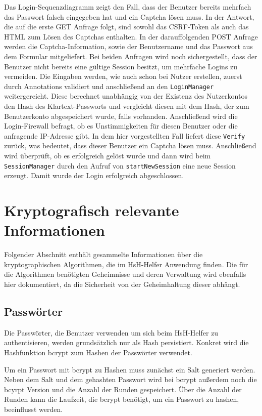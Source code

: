 \documentclass[12pt,DIV14,BCOR10mm,a4paper,parskip=half-,headsepline,headinclude,english,ngerman,bibliography=totocnumbered]{scrreprt}
\begin{document}
Das Login-Sequenzdiagramm zeigt den Fall, dass der Benutzer bereits mehrfach das Passwort falsch eingegeben hat und ein Captcha lösen muss. In der Antwort, die auf die erste GET Anfrage folgt, sind sowohl das CSRF-Token als auch das HTML zum Lösen des Captchas enthalten. In der darauffolgenden POST Anfrage werden die Captcha-Information, sowie der Benutzername und das Passwort aus dem Formular mitgeliefert. Bei beiden Anfragen wird noch sichergestellt, dass der Benutzer nicht bereits eine gültige Session besitzt, um mehrfache Logins zu vermeiden. Die Eingaben werden, wie auch schon bei Nutzer erstellen, zuerst durch Annotations validiert und anschließend an den \texttt{LoginManager} weitergereicht. Diese berechnet unabhängig von der Existenz des Nutzerkontos den Hash des Klartext-Passworts und vergleicht diesen mit dem Hash, der zum Benutzerkonto abgespeichert wurde, falls vorhanden. Anschließend wird die Login-Firewall befragt, ob es Unstimmigkeiten für diesen Benutzer oder die anfragende IP-Adresse gibt. In dem hier vorgestellten Fall liefert diese \texttt{Verify} zurück, was bedeutet, dass dieser Benutzer ein Captcha lösen muss. Anschließend wird überprüft, ob es erfolgreich gelöst wurde und dann wird beim \texttt{SessionManager} durch den Aufruf von \texttt{startNewSession} eine neue Session erzeugt. Damit wurde der Login erfolgreich abgeschlossen.

\chapter{Kryptografisch relevante Informationen}
Folgender Abschnitt enthält gesammelte Informationen über die kryptographischen Algorithmen, die im HsH-Helfer Anwendung finden. Die für die Algorithmen benötigten Geheimnisse und deren Verwaltung wird ebenfalls hier dokumentiert, da die Sicherheit von der Geheimhaltung dieser abhängt.

\section{Passwörter}
Die Passwörter, die Benutzer verwenden um sich beim HsH-Helfer zu authentisieren, werden grundsätzlich nur als Hash persistiert. Konkret wird die Hashfunktion bcrypt zum Hashen der Passwörter verwendet.

Um ein Passwort mit bcrypt zu Hashen muss zunächst ein Salt generiert werden. Neben dem Salt und dem gehashten Passwort wird bei bcrypt außerdem noch die bcyrpt Version und die Anzahl der Runden gespeichert. Über die Anzahl der Runden kann die Laufzeit, die bcrypt benötigt, um ein Passwort zu hashen, beeinflusst werden.
\end{document}
